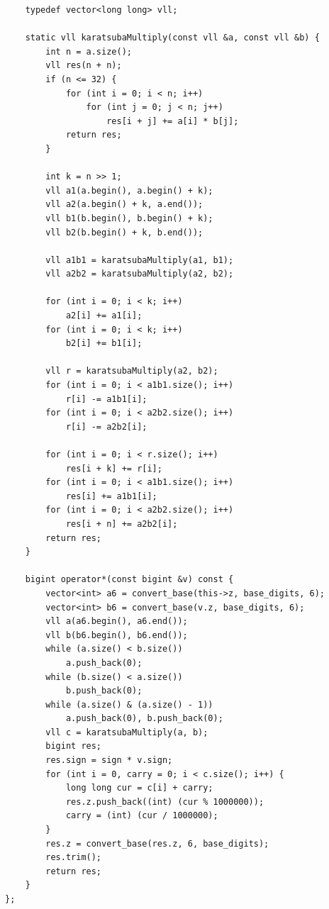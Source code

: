\documentclass[twoside]{article}
\begin{document}
\begin{lstlisting}
    typedef vector<long long> vll;

    static vll karatsubaMultiply(const vll &a, const vll &b) {
        int n = a.size();
        vll res(n + n);
        if (n <= 32) {
            for (int i = 0; i < n; i++)
                for (int j = 0; j < n; j++)
                    res[i + j] += a[i] * b[j];
            return res;
        }

        int k = n >> 1;
        vll a1(a.begin(), a.begin() + k);
        vll a2(a.begin() + k, a.end());
        vll b1(b.begin(), b.begin() + k);
        vll b2(b.begin() + k, b.end());

        vll a1b1 = karatsubaMultiply(a1, b1);
        vll a2b2 = karatsubaMultiply(a2, b2);

        for (int i = 0; i < k; i++)
            a2[i] += a1[i];
        for (int i = 0; i < k; i++)
            b2[i] += b1[i];

        vll r = karatsubaMultiply(a2, b2);
        for (int i = 0; i < a1b1.size(); i++)
            r[i] -= a1b1[i];
        for (int i = 0; i < a2b2.size(); i++)
            r[i] -= a2b2[i];

        for (int i = 0; i < r.size(); i++)
            res[i + k] += r[i];
        for (int i = 0; i < a1b1.size(); i++)
            res[i] += a1b1[i];
        for (int i = 0; i < a2b2.size(); i++)
            res[i + n] += a2b2[i];
        return res;
    }

    bigint operator*(const bigint &v) const {
        vector<int> a6 = convert_base(this->z, base_digits, 6);
        vector<int> b6 = convert_base(v.z, base_digits, 6);
        vll a(a6.begin(), a6.end());
        vll b(b6.begin(), b6.end());
        while (a.size() < b.size())
            a.push_back(0);
        while (b.size() < a.size())
            b.push_back(0);
        while (a.size() & (a.size() - 1))
            a.push_back(0), b.push_back(0);
        vll c = karatsubaMultiply(a, b);
        bigint res;
        res.sign = sign * v.sign;
        for (int i = 0, carry = 0; i < c.size(); i++) {
            long long cur = c[i] + carry;
            res.z.push_back((int) (cur % 1000000));
            carry = (int) (cur / 1000000);
        }
        res.z = convert_base(res.z, 6, base_digits);
        res.trim();
        return res;
    }
};
\end{lstlisting}
\end{document}
